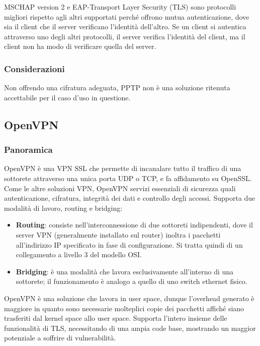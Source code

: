 MSCHAP version 2 e EAP-Transport Layer Security (TLS) sono protocolli migliori rispetto agli altri supportati perché offrono mutua autenticazione, dove sia il client che il server verificano l'identità dell'altro. Se un client si autentica attraverso uno degli altri protocolli, il server verifica l'identità del client, ma il client non ha modo di verificare quella del server.

\subsubsection{Considerazioni}
Non offrendo una cifratura adeguata, PPTP non è una soluzione ritenuta accettabile per il caso d'uso in questione.

\subsection{OpenVPN}
\subsubsection{Panoramica}
OpenVPN è una VPN SSL che permette di incanalare tutto il traffico di una sottorete attraverso una unica porta UDP o TCP, e fa affidamento su OpenSSL. Come le altre soluzioni VPN, OpenVPN servizi essenziali di sicurezza quali autenticazione, cifratura, integrità dei dati e controllo degli accessi.
Supporta due modalità di lavoro, routing e bridging:
\begin{itemize}
    \item \textbf{Routing}: consiste nell'interconnessione di due sottoreti indipendenti, dove il server VPN (generalmente installato sul router) inoltra i pacchetti all'indirizzo IP specificato in fase di configurazione. Si tratta quindi di un collegamento a livello $3$ del modello OSI.
    \item \textbf{Bridging}: è una modalità che lavora esclusivamente all'interno di una sottorete; il funzionamento è analogo a quello di uno switch ethernet fisico.
\end{itemize}

OpenVPN è una soluzione che lavora in user space, dunque l'overhead generato è maggiore in quanto sono necessarie molteplici copie dei pacchetti affiché siano trasferiti dal kernel space allo user space. Supporta l'intero insieme delle funzionalità di TLS, necessitando di una ampia code base, mostrando un maggior potenziale a soffrire di vulnerabilità.

